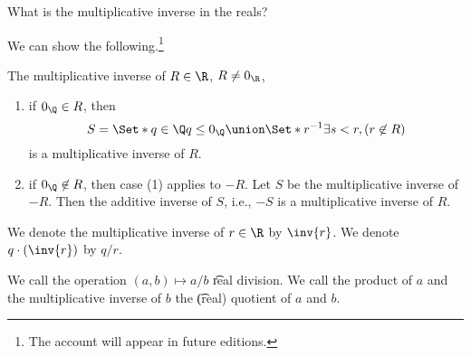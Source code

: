 

What is the multiplicative inverse in the reals?


We can show the following.\footnote{The account will appear in future editions.}

\begin{proposition}
  The multiplicative inverse of $R \in \R$, $R \neq 0_{\R}$,
	\begin{enumerate}
		\item if $0_{\Q} \in R$, then
		\[S = \Set*{q \in \Q}{q \leq 0_{\Q}} \union \Set*{r^{-1}}{\exists s < r, (r \not\in R)} \]
		is a multiplicative inverse of $R$.

		\item if $0_{\Q} \not\in R$, then case (1) applies to $-R$. Let $S$ be the multiplicative inverse of $-R$. Then  the additive inverse of $S$, i.e., $-S$ is a multiplicative inverse of $R$.
	\end{enumerate}
\end{proposition}


We denote the multiplicative inverse of $r \in \R$ by $\inv{r}$.
We denote $q \cdot (\inv{r})$ by $q/r$.


We call the operation $(a, b) \mapsto a/b$ \t{real division}.
We call the product of $a$ and the multiplicative inverse of $b$ the \t{(real) quotient} of $a$ and $b$.

\blankpage
